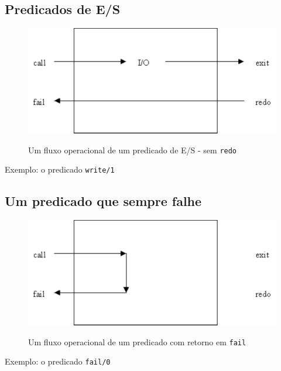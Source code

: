 \documentclass[final,a4paper]{article}
\begin{document}
\newpage
\subsection{Predicados de E/S}

\vskip 3cm

\begin{figure}[!htb]
\centering
\includegraphics[scale=0.8]{figuras/fluxo_predicado_2_IO.pdf}
%
\label{fig_fluxo_2}
\caption{Um fluxo operacional de um predicado de E/S - sem \texttt{redo}}
\end{figure}

Exemplo: o predicado \texttt{write/1}


\newpage
\subsection{Um predicado que sempre falhe}

\vskip 2cm

\begin{figure}[!htb]
\centering
\includegraphics[scale=0.8]{figuras/fluxo_predicado_3_fail.pdf}
%
\label{fig_fluxo_3}
\caption{Um fluxo operacional de um predicado com retorno em \texttt{fail}}
\end{figure}

Exemplo: o predicado \texttt{fail/0}
\end{document}
